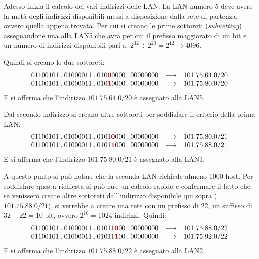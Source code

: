 \documentclass[a4paper]{article}
\newcommand{\binaryaddresspointed}[4]{#1\:.\:#2\:.\:#3\:.\:#4}
\begin{document}
	\noindent
	Adesso inizia il calcolo dei vari indirizzi delle LAN. La LAN numero 5 deve avere la metà degli indirizzi disponibili messi a disposizione dalla rete di partenza, ovvero quella appena trovata. Per cui si creano le prime sottoreti (\emph{subnetting}) assegnandone una alla LAN5 che avrà per cui il prefisso maggiorato di un bit e un numero di indirizzi disponibili pari a: $2^{32} \div 2^{20} = 2^{12} \rightarrow 4096$.\newline
	
	\noindent
	Quindi si creano le due sottoreti:
	\begin{equation*}
		\begin{array}{lll}
			\binaryaddresspointed{01100101}{01000011}{010\textcolor{Red3}{\boldsymbol{0}}0000}{00000000} & \longrightarrow & 101.75.64.0/20 \\
			\binaryaddresspointed{01100101}{01000011}{010\textcolor{Red3}{\boldsymbol{1}}0000}{00000000} & \longrightarrow & 101.75.80.0/20
		\end{array}
	\end{equation*}
	E si afferma che l’indirizzo $101.75.64.0/20$ è assegnato alla LAN5.\newline
	
	\noindent
	Dal secondo indirizzo si creano altre sottoreti per soddisfare il criterio della prima LAN:
	\begin{equation*}
		\begin{array}{lll}
			\binaryaddresspointed{01100101}{01000011}{0101\textcolor{Red3}{\boldsymbol{0}}000}{00000000} & \longrightarrow & 101.75.80.0/21 \\
			\binaryaddresspointed{01100101}{01000011}{0101\textcolor{Red3}{\boldsymbol{1}}000}{00000000} & \longrightarrow & 101.75.88.0/21
		\end{array}
	\end{equation*}
	E si afferma che l’indirizzo $101.75.80.0/21$ è assegnato alla LAN1.\newline
	
	\noindent
	A questo punto si può notare che la seconda LAN richiede almeno 1000 host. Per soddisfare questa richiesta si può fare un calcolo rapido e confermare il fatto che se venissero create altre sottoreti dall’indirizzo disponibile qui sopra ($101.75.88.0/21$), si verrebbe a creare una rete con un prefisso di 22, un suffisso di $32-22=10$ bit, ovvero $2^{10} = 1024$ indirizzi. Quindi:
	\begin{equation*}
		\begin{array}{lll}
			\binaryaddresspointed{01100101}{01000011}{01011\textcolor{Red3}{\boldsymbol{0}}00}{00000000} & \longrightarrow & 101.75.88.0/22 \\
			\binaryaddresspointed{01100101}{01000011}{01011\textcolor{Red3}{\boldsymbol{1}}00}{00000000} & \longrightarrow & 101.75.92.0/22
		\end{array}
	\end{equation*}
	E si afferma che l’indirizzo $101.75.88.0/22$ è assegnato alla LAN2.\newline
	
\end{document}
